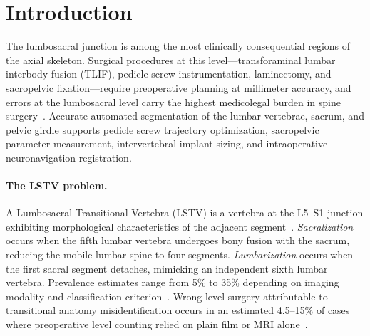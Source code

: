 \documentclass[pmlr]{jmlr}
\newcommand{\num}[1]{\textcolor{black}{\bfseries #1}}
\newcommand{\pagestack}[5]{%
  \node[pback=#4] at ($(#2,#3)+(0.22,0.22)$) {};
  \node[pback=#4] at ($(#2,#3)+(0.11,0.11)$) {};
  \node[pfront=#4] (#1) at (#2,#3) {#5};
}
\newcommand{\vacph}[1]{\parbox[c][1.85cm][c]{1.55cm}{\centering
  \scriptsize\itshape\color{vacgray}#1\\[3pt]\tiny[2-D render]}}
\newcommand{\vacRibs}      {\vacph{+ ribs}}
\begin{document}
\begin{figure}[t]
{{}}
\end{figure}

\section{Introduction}
\label{sec:intro}

The lumbosacral junction is among the most clinically consequential
regions of the axial skeleton.
Surgical procedures at this level---transforaminal lumbar interbody
fusion (TLIF), pedicle screw instrumentation, laminectomy, and
sacropelvic fixation---require preoperative planning at millimeter
accuracy, and errors at the lumbosacral level carry the highest
medicolegal burden in spine surgery~\citep{Carrino2011EffectImaging}.
Accurate automated segmentation of the lumbar vertebrae, sacrum, and
pelvic girdle supports pedicle screw trajectory optimization,
sacropelvic parameter measurement, intervertebral implant sizing,
and intraoperative neuronavigation registration.

\paragraph{The LSTV problem.}
A Lumbosacral Transitional Vertebra (LSTV) is a vertebra at the
L5--S1 junction exhibiting morphological characteristics of the
adjacent segment~\citep{Castellvi1984LumbosacralDefects}.
\emph{Sacralization} occurs when the fifth lumbar vertebra undergoes
bony fusion with the sacrum, reducing the mobile lumbar spine to
four segments.
\emph{Lumbarization} occurs when the first sacral segment detaches,
mimicking an independent sixth lumbar vertebra.
Prevalence estimates range from 5\% to 35\% depending on imaging
modality and classification criterion~\citep{Sekharappa2014LumbosacralSignificance}.
Wrong-level surgery attributable to transitional anatomy
misidentification occurs in an estimated 4.5--15\% of cases where
preoperative level counting relied on plain film or MRI
alone~\citep{Konin2010LumbosacralRelevance}.
\end{document}
